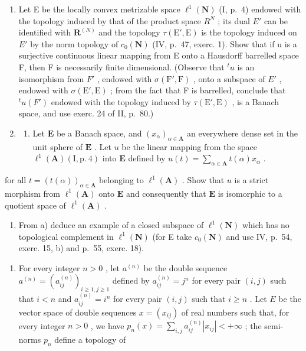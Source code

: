 \begin{enumerate}
\def\labelenumi{\arabic{enumi})}
\setcounter{enumi}{5}
\item
  Let E be the locally convex metrizable space \(\ell^{1}(\mathbf{N})\) (I, p.~4) endowed with the topology induced by that of the product space \(R^{N}\) ; its dual \(E'\) can be identified with \(\mathbf{R}^{(N)}\) and the topology \(\tau(\mathrm{E}',\mathrm{E})\) is the topology induced on \(E'\) by the norm topology of \(c_{0}(\mathbf{N})\) (IV, p.~47, exerc. 1). Show that if u is a surjective continuous linear mapping from E onto a Hausdorff barrelled space F, then F is necessarily finite dimensional. (Observe that \({}^{t}u\) is an isomorphism from \(F'\) , endowed with \(\sigma(\mathrm{F}',\mathrm{F})\) , onto a subspace of \(E'\) , endowed with \(\sigma(\mathrm{E}',\mathrm{E})\) ; from the fact that F is barrelled, conclude that \({}^{t}u(F')\) endowed with the topology induced by \(\tau(\mathrm{E}',\mathrm{E})\) , is a Banach space, and use exerc. 24 of II, p.~80.)
\item
  \begin{enumerate}
  \def\labelenumii{\alph{enumii})}
  \tightlist
  \item
    Let \(\mathbf{E}\) be a Banach space, and \((x_{\alpha})_{\alpha \in \mathbf{A}}\) an everywhere dense set in the unit sphere of \(\mathbf{E}\) . Let \(u\) be the linear mapping from the space \(\ell^1 (\mathbf{A})(\mathrm{I},\mathrm{p.~4})\) into \(\mathbf{E}\) defined by \(u(t) = \sum_{\alpha \in \mathbf{A}}t(\alpha)x_{\alpha}\) .
  \end{enumerate}
\end{enumerate}

for all \(t = (t(\alpha))_{\alpha \in \mathbf{A}}\) belonging to \(\ell^1 (\mathbf{A})\) . Show that \(u\) is a strict morphism from \(\ell^1 (\mathbf{A})\) onto \(\mathbf{E}\) and consequently that \(\mathbf{E}\) is isomorphic to a quotient space of \(\ell^1 (\mathbf{A})\) .

\begin{enumerate}
\def\labelenumi{\alph{enumi})}
\setcounter{enumi}{1}
\tightlist
\item
  From a) deduce an example of a closed subspace of \(\ell^{1}(\mathbf{N})\) which has no topological complement in \(\ell^{1}(\mathbf{N})\) (for E take \(c_{0}(\mathbf{N})\) and use IV, p.~54, exerc. 15, b) and p.~55, exerc. 18).
\end{enumerate}

\begin{enumerate}
\def\labelenumi{\arabic{enumi})}
\setcounter{enumi}{7}
\tightlist
\item
  For every integer \(n > 0\) , let \(a^{(n)}\) be the double sequence \(a^{(n)} = (a_{ij}^{(n)})_{i\geqslant 1,j\geqslant 1}\) defined by \(a_{ij}^{(n)} = j^n\) for every pair \((i,j)\) such that \(i < n\) and \(a_{ij}^{(n)} = i^n\) for every pair \((i,j)\) such that \(i\geqslant n\) . Let \(E\) be the vector space of double sequences \(x = (x_{ij})\) of real numbers such that, for every integer \(n > 0\) , we have \(p_n(x) = \sum_{i,j}a_{ij}^{(n)}|x_{ij}| < +\infty\) ; the semi-norms \(p_n\) define a topology of
\end{enumerate}

